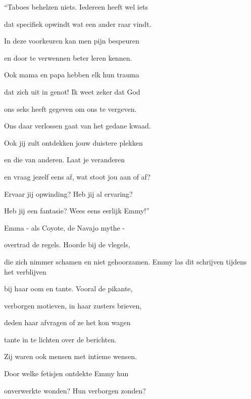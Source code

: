 “Taboes behelzen niets.
Iedereen heeft wel iets

dat specifiek opwindt
wat een ander raar vindt.

In deze voorkeuren
kan men pijn bespeuren

en door te verwennen
beter leren kennen.

Ook mama en papa
hebben elk hun trauma

dat zich uit in genot!
Ik weet zeker dat God

ons seks heeft gegeven
om ons te vergeven.

Ons daar verlossen gaat
van het gedane kwaad.

Ook jij zult ontdekken
jouw duistere plekken

en die van anderen.
Laat je veranderen

en vraag jezelf eens af,
wat stoot jou aan of af?

Ervaar jij opwinding?
Heb jij al ervaring?

Heb jij een fantasie?
Wees eens eerlijk Emmy!”

Emma - als Coyote,
de Navajo mythe -

overtrad de regels.
Hoorde bij de vlegels,

die zich nimmer schamen
en niet gehoorzamen.
Emmy las dit schrijven
tijdens het verblijven

bij haar oom en tante.
Vooral de pikante,

verborgen motieven,
in haar zusters brieven,

deden haar afvragen
of ze het kon wagen

tante in te lichten
over de berichten.

Zij waren ook mensen
met intieme wensen.

Door welke fetisjen
ontdekte Emmy hun

onverwerkte wonden?
Hun verborgen zonden?
